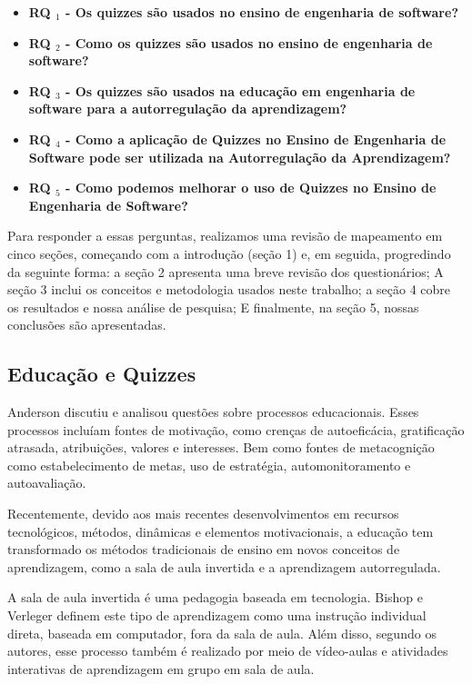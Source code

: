 \begin {itemize}
    \item\textbf {RQ $ _1 $ - Os quizzes são usados no ensino de engenharia de software?}
     \item\textbf {RQ $ _2 $ - Como os quizzes são usados no ensino de engenharia de software?}
     \item\textbf {RQ $ _3 $ - Os quizzes são usados na educação em engenharia de software para a autorregulação da aprendizagem?}
     \item\textbf {RQ $ _4 $ - Como a aplicação de Quizzes no Ensino de Engenharia de Software pode ser utilizada na Autorregulação da Aprendizagem?}
     \item\textbf {RQ $ _5 $ - Como podemos melhorar o uso de Quizzes no Ensino de Engenharia de Software?}
\end {itemize}

Para responder a essas perguntas, realizamos uma revisão de mapeamento em cinco seções, começando com a introdução (seção 1) e, em seguida, progredindo da seguinte forma: a seção 2 apresenta uma breve revisão dos questionários; A seção 3 inclui os conceitos e metodologia usados neste trabalho; a seção 4 cobre os resultados e nossa análise de pesquisa; E finalmente, na seção 5, nossas conclusões são apresentadas.

\subsection{Educação e Quizzes}

Anderson \cite{anderson_reflections_1984} discutiu e analisou questões sobre processos educacionais. Esses processos incluíam fontes de motivação, como crenças de autoeficácia, gratificação atrasada, atribuições, valores e interesses. Bem como fontes de metacognição como estabelecimento de metas, uso de estratégia, automonitoramento e autoavaliação.

Recentemente, devido aos mais recentes desenvolvimentos em recursos tecnológicos, métodos, dinâmicas e elementos motivacionais, a educação tem transformado os métodos tradicionais de ensino em novos conceitos de aprendizagem, como a sala de aula invertida e a aprendizagem autorregulada.

A sala de aula invertida é uma pedagogia baseada em tecnologia. Bishop e Verleger\cite {bishop_flipped_2013} definem este tipo de aprendizagem como uma instrução individual direta, baseada em computador, fora da sala de aula. Além disso, segundo os autores, esse processo também é realizado por meio de vídeo-aulas e atividades interativas de aprendizagem em grupo em sala de aula.

